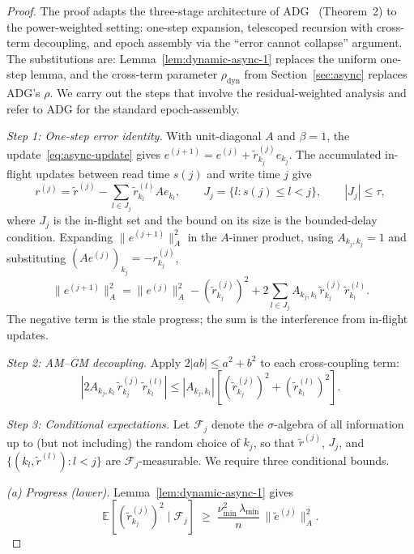\documentclass[pdflatex,sn-mathphys-num]{sn-jnl}%
\newcommand{\E}{\mathbb{E}}
\newcommand{\Anorm}[1]{\|#1\|_{A}}
\newcommand{\lmin}{\lambda_{\min}}
\theoremstyle{thmstyleone}%
\theoremstyle{thmstyletwo}%
\theoremstyle{thmstylethree}%
\begin{document}
\begin{proof}
The proof adapts the three-stage architecture of ADG~\cite{avron2015revisiting} (Theorem~2) to the power-weighted setting: one-step expansion, telescoped recursion with cross-term decoupling, and epoch assembly via the ``error cannot collapse'' argument. The substitutions are: Lemma~\ref{lem:dynamic-async-1} replaces the uniform one-step lemma, and the cross-term parameter $\rho_{\text{dyn}}$ from Section~\ref{sec:async} replaces ADG's $\rho$. We carry out the steps that involve the residual-weighted analysis and refer to ADG for the standard epoch-assembly.

\smallskip\noindent\textit{Step 1: One-step error identity.} With unit-diagonal $A$ and $\beta = 1$, the update~\eqref{eq:async-update} gives $e^{(j+1)} = e^{(j)} + \tilde r_{k_j}^{(j)} e_{k_j}$. The accumulated in-flight updates between read time $s(j)$ and write time $j$ give
\[
r^{(j)} = \tilde r^{(j)} - \sum_{l \in J_j} \tilde r_{k_l}^{(l)} A e_{k_l}, \qquad J_j = \{l : s(j) \leq l < j\}, \qquad |J_j| \leq \tau,
\]
where $J_j$ is the in-flight set and the bound on its size is the bounded-delay condition. Expanding $\Anorm{e^{(j+1)}}^2$ in the $A$-inner product, using $A_{k_j,k_j} = 1$ and substituting $(Ae^{(j)})_{k_j} = -r_{k_j}^{(j)}$,
\begin{equation}
\label{eq:async-onestep-proof}
\Anorm{e^{(j+1)}}^2 = \Anorm{e^{(j)}}^2 - (\tilde r_{k_j}^{(j)})^2 + 2 \sum_{l \in J_j} A_{k_j, k_l}\,\tilde r_{k_j}^{(j)}\,\tilde r_{k_l}^{(l)}.
\end{equation}
The negative term is the stale progress; the sum is the interference from in-flight updates.

\smallskip\noindent\textit{Step 2: AM--GM decoupling.} Apply $2|ab| \leq a^2 + b^2$ to each cross-coupling term:
\begin{equation}
\label{eq:async-amgm}
\left|2 A_{k_j, k_l}\,\tilde r_{k_j}^{(j)}\,\tilde r_{k_l}^{(l)}\right| \leq |A_{k_j, k_l}| \left[(\tilde r_{k_j}^{(j)})^2 + (\tilde r_{k_l}^{(l)})^2\right].
\end{equation}

\smallskip\noindent\textit{Step 3: Conditional expectations.} Let $\mathcal{F}_j$ denote the $\sigma$-algebra of all information up to (but not including) the random choice of $k_j$, so that $\tilde r^{(j)}$, $J_j$, and $\{(k_l, \tilde r^{(l)}) : l < j\}$ are $\mathcal{F}_j$-measurable. We require three conditional bounds.

\textit{(a) Progress (lower).} Lemma~\ref{lem:dynamic-async-1} gives
\[
\E\!\left[(\tilde r_{k_j}^{(j)})^2 \mid \mathcal{F}_j\right] \;\geq\; \frac{\nu_{\min}^2\,\lmin}{n}\,\Anorm{\tilde e^{(j)}}^2.
\]


\end{proof}
\end{document}
